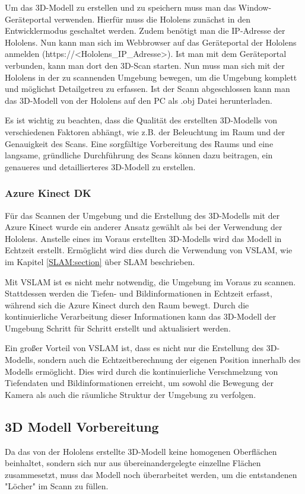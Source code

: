         Um das 3D-Modell zu erstellen und zu speichern muss man das Window-Geräteportal verwenden. Hierfür muss die Hololens zunächst in den Entwicklermodus geschaltet werden. Zudem benötigt man die IP-Adresse der Hololens. Nun kann man sich im Webbrowser auf das Geräteportal der Hololens anmelden (https://<Hololens\_IP\_Adresse>). Ist man mit dem Geräteportal verbunden, kann man dort den 3D-Scan starten. Nun muss man sich mit der Hololens in der zu scannenden Umgebung bewegen, um die Umgebung komplett und möglichst Detailgetreu zu erfassen. Ist der Scann abgeschlossen kann man das 3D-Modell von der Hololens auf den PC als .obj Datei herunterladen.

        Es ist wichtig zu beachten, dass die Qualität des erstellten 3D-Modells von verschiedenen Faktoren abhängt, wie z.B. der Beleuchtung im Raum und der Genauigkeit des Scans. Eine sorgfältige Vorbereitung des Raums und eine langsame, gründliche Durchführung des Scans können dazu beitragen, ein genaueres und detaillierteres 3D-Modell zu erstellen.
        \subsubsection{Azure Kinect \ac{DK}} \label{kinect:subsubsection}
        Für das Scannen der Umgebung und die Erstellung des 3D-Modells mit der Azure Kinect wurde ein anderer Ansatz gewählt als bei der Verwendung der Hololens. Anstelle eines im Voraus erstellten 3D-Modells wird das Modell in Echtzeit erstellt. Ermöglicht wird dies durch die Verwendung von \ac{VSLAM}, wie im Kapitel \ref{SLAM:section} über \ac{SLAM} beschrieben.

        Mit \ac{VSLAM} ist es nicht mehr notwendig, die Umgebung im Voraus zu scannen. Stattdessen werden die Tiefen- und Bildinformationen in Echtzeit erfasst, während sich die Azure Kinect durch den Raum bewegt. Durch die kontinuierliche Verarbeitung dieser Informationen kann das 3D-Modell der Umgebung Schritt für Schritt erstellt und aktualisiert werden.

        Ein großer Vorteil von \ac{VSLAM} ist, dass es nicht nur die Erstellung des 3D-Modells, sondern auch die Echtzeitberechnung der eigenen Position innerhalb des Modells ermöglicht. Dies wird durch die kontinuierliche Verschmelzung von Tiefendaten und Bildinformationen erreicht, um sowohl die Bewegung der Kamera als auch die räumliche Struktur der Umgebung zu verfolgen.

    \subsection{3D Modell Vorbereitung} \label{3d_modell_vorbereitung:subsection}
    Da das von der Hololens erstellte 3D-Modell keine homogenen Oberflächen beinhaltet, sondern sich nur aus übereinandergelegte einzellne Flächen zusammesetzt, muss das Modell noch überarbeitet werden, um die entstandenen "Löcher" im Scann zu füllen.
    
